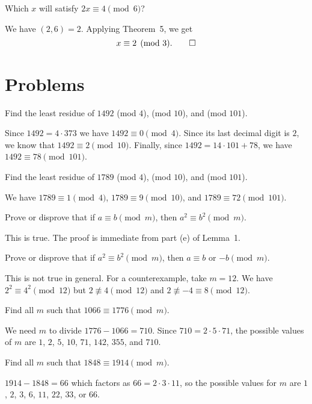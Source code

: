  Which $x$ will satisfy $2x\equiv4\pmod6$?
\begin{solution}
  We have $(2,6) = 2$. Applying Theorem~5, we get
  \begin{equation*}
    x\equiv2\pmod3. \qedhere
  \end{equation*}
\end{solution}

\section{Problems}

 Find the least residue of $1492$ (mod $4$), (mod $10$), and
(mod $101$).
\begin{solution}
  Since $1492 = 4\cdot373$ we have $1492\equiv0\pmod4$. Since its last
  decimal digit is $2$, we know that $1492\equiv2\pmod{10}$. Finally,
  since $1492 = 14\cdot101 + 78$, we have $1492\equiv78\pmod{101}$.
\end{solution}

 Find the least residue of $1789$ (mod $4$), (mod $10$), and
(mod $101$).
\begin{solution}
  We have $1789\equiv1\pmod4$, $1789\equiv9\pmod{10}$, and
  $1789\equiv72\pmod{101}$.
\end{solution}

 Prove or disprove that if $a\equiv b\pmod m$, then
$a^2\equiv b^2\pmod m$.
\begin{solution}
  This is true. The proof is immediate from part (e) of Lemma~1.
\end{solution}

 Prove or disprove that if $a^2\equiv b^2\pmod m$, then
$a\equiv b$ or $-b\pmod m$.
\begin{solution}
  This is not true in general. For a counterexample, take $m = 12$. We
  have $2^2\equiv4^2\pmod{12}$ but $2\not\equiv4\pmod{12}$ and
  $2\not\equiv-4\equiv8\pmod{12}$.
\end{solution}

 Find all $m$ such that $1066\equiv1776\pmod{m}$.
\begin{solution}
  We need $m$ to divide $1776 - 1066 = 710$. Since
  $710 = 2\cdot5\cdot71$, the possible values of $m$ are $1$, $2$,
  $5$, $10$, $71$, $142$, $355$, and $710$.
\end{solution}

 Find all $m$ such that $1848\equiv1914\pmod{m}$.
\begin{solution}
  $1914 - 1848 = 66$ which factors as $66 = 2\cdot3\cdot11$, so the
  possible values for $m$ are $1$, $2$, $3$, $6$, $11$, $22$, $33$, or
  $66$.
\end{solution}

